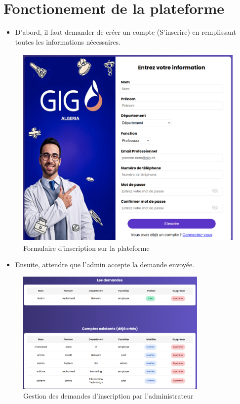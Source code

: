 \documentclass{article}
\begin{document}
\section*{Fonctionement de la plateforme}
\begin{itemize}
    \item D'abord, il faut demander de créer un compte (S'inscrire) en remplissant toutes les informations nécessaires.
\end{itemize}
\begin{figure}[H]
  \centering
  \includegraphics[height=10cm]{SIGN-IN.png}
  \caption{Formulaire d'inscription sur la plateforme}
  \label{fig:sign-up}
\end{figure}

\begin{itemize}
     \item Ensuite, attendre que l'admin accepte la demande envoyée.
\end{itemize}
\begin{figure}[H]
  \centering
  \includegraphics[height=6cm]{GERE-COMPTE.png}
  \caption{Gestion des demandes d'inscription par l'administrateur}
  \label{fig:admin-compte}
\end{figure}
\end{document}
